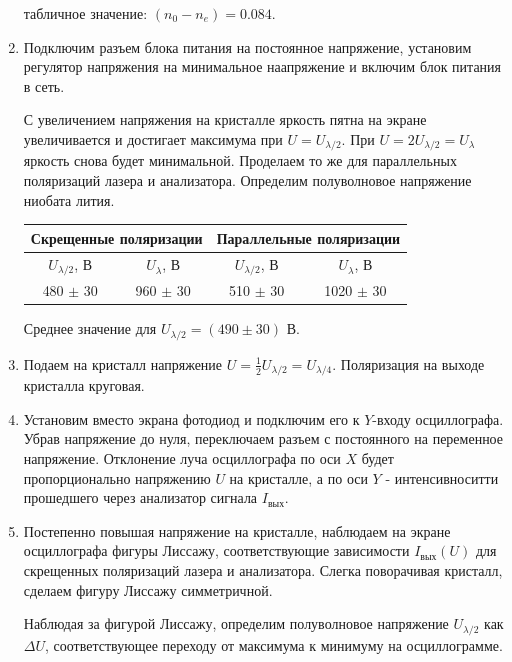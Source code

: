 \documentclass[a4paper,12pt]{article}
\begin{document}
\begin{enumerate}
    табличное значение: $(n_0-n_e)=0.084$.

    \item Подключим разъем блока питания на постоянное напряжение, установим регулятор напряжения на минимальное наапряжение и включим блок питания в сеть.

    С увеличением напряжения на кристалле яркость пятна на экране увеличивается и достигает максимума при $U=U_{\lambda/2}$. При $U=2U_{\lambda/2}=U_\lambda$ яркость снова будет минимальной. Проделаем то же для параллельных поляризаций лазера и анализатора. Определим полуволновое напряжение ниобата лития.

    \begin{table}[h!]
    \centering
    \begin{tabular}{|c|c||c|c|}
         \hline
         \multicolumn{2}{|c}{Скрещенные поляризации}&\multicolumn{2}{|c|}{Параллельные поляризации}  \\ \hline\hline
         $U_{\lambda/2}$, В & $U_{\lambda}$, В & $U_{\lambda/2}$, В & $U_{\lambda}$, В \\ \hline
         480 $\pm$ 30 & 960 $\pm$ 30 & 510 $\pm$ 30 & 1020 $\pm$ 30 \\ \hline
    \end{tabular}
    \end{table}

    Среднее значение для $U_{\lambda/2} = (490 \pm 30)$ В.

    \item Подаем на кристалл напряжение $U=\frac{1}{2}U_{\lambda/2}=U_{\lambda/4}$. Поляризация на выходе кристалла круговая.

    \item Установим вместо экрана фотодиод и подключим его к $Y$-входу осциллографа. Убрав напряжение до нуля, переключаем разъем с постоянного на переменное напряжение. Отклонение луча осциллографа по оси $X$ будет пропорционально напряжению $U$ на кристалле, а по оси $Y$ - интенсивноситти прошедшего через анализатор сигнала $I_\text{вых}$.

    \item Постепенно повышая напряжение на кристалле, наблюдаем на экране осциллографа фигуры Лиссажу, соответствующие зависимости $I_\text{вых}(U)$ для скрещенных поляризаций лазера и анализатора. Слегка поворачивая кристалл, сделаем фигуру Лиссажу симметричной.

    Наблюдая за фигурой Лиссажу, определим полуволновое напряжение $U_{\lambda/2}$ как $\Delta U$, соответствующее переходу от максимума к минимуму на осциллограмме.


\end{enumerate}
\end{document}
